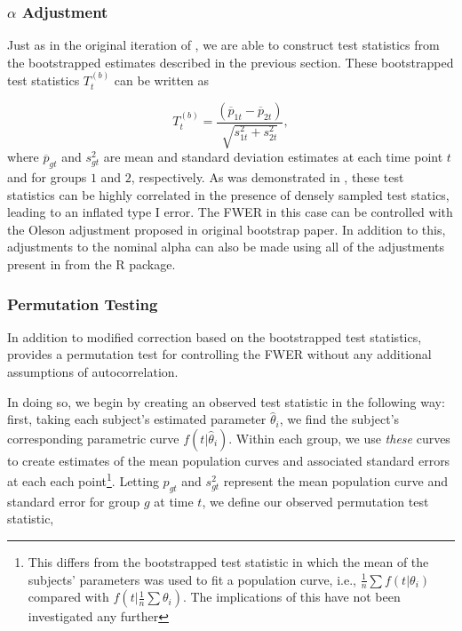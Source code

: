\subsubsection{$\alpha$ Adjustment}

Just as in the original iteration of , we are able to construct test statistics from the bootstrapped estimates described in the previous section. These bootstrapped test statistics $T_t^{(b)}$ can be written as 

\begin{equation}\label{eq:test_statistic}
T_t^{(b)} = \frac{(\overline{p}_{1t} - \overline{p}_{2t})}{\sqrt{s_{1t}^2 + s_{2t}^2}},
\end{equation}
where $\overline{p}_{gt}$ and $s_{gt}^2$ are mean and standard deviation estimates at each time point $t$ and for groups $1$ and $2$, respectively. As was demonstrated in \cite{oleson2017detecting}, these test statistics can be highly correlated in the presence of densely sampled test statics, leading to an inflated type I error. The FWER in this case can be controlled with the Oleson adjustment proposed in original bootstrap paper. In addition to this, adjustments to the nominal alpha can also be made using all of the adjustments present in  from the R  package.


\subsubsection{Permutation Testing}

In addition to modified correction based on the bootstrapped test statistics,  provides a permutation test for controlling the FWER without any additional assumptions of autocorrelation. 

In doing so, we begin by creating an observed test statistic in the following way: first, taking each subject's estimated parameter $\hat{\theta}_i$, we find the subject's corresponding parametric curve $f(t|\hat{\theta}_i)$. Within each group, we use \textit{these} curves to create estimates of the mean population curves and associated standard errors at each each point\footnote{This differs from the bootstrapped test statistic in which the mean of the subjects' parameters was used to fit a population curve, i.e., $\frac1n \sum f(t|\theta_i)$ compared with $f \left( t | \frac1n \sum \theta_i \right)$. The implications of this have not been investigated any further}. Letting $p_{gt}$ and $s_{gt}^2$ represent the mean population curve and standard error for group $g$ at time $t$, we define our observed permutation test statistic, 


